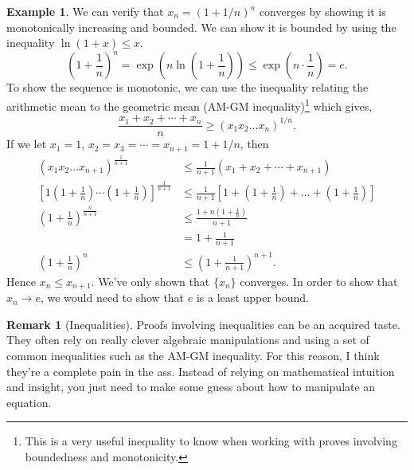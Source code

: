 \documentclass{article}
\theoremstyle{definition}
\newtheorem{example}{Example}[section]
\newtheorem{remark}{Remark}[section]
\begin{document}
\begin{example}
	We can verify that $ x_n=(1+1/n)^n $ converges by showing it is monotonically increasing and bounded. We can show it is bounded by using the inequality $ \ln(1+x)\le x $. $$\left(1+\frac{1}{n}\right)^n=\exp\left(n\ln\left(1+\frac{1}{n} \right)\right)\le \exp\left(n\cdot\frac{1}{n}\right)=e. $$ To show the sequence is monotonic, we can use the inequality relating the arithmetic mean to the geometric mean (AM-GM inequality)\footnote{This is a very useful inequality to know when working with proves involving boundedness and monotonicity.} which gives, $$ \frac{x_1+x_2+\cdots+x_n}{n}\ge(x_1x_2\ldots x_n)^{1/n}.$$ If we let $ x_1=1 $, $ x_2=x_3=\cdots=x_{n+1}=1+1/n $, then 
	\begin{align*}
(x_1x_2\ldots x_{n+1})^{\frac{1}{n+1}}&\le \frac{1}{n+1}(x_1+x_2+\cdots+x_{n+1})\\\left[1\left(1+\frac{1}{n}\right)\cdots \left(1+\frac{1}{n}\right)\right]^\frac{1}{n+1}&\le\frac{1}{n+1}\left[1+\left(1+\frac{1}{n}\right)+\ldots + \left(1+\frac{1}{n}\right)\right]\\\left(1+\frac{1}{n}\right)^\frac{n}{n+1}&\le \frac{1+n\left(1+\frac{1}{n}\right)}{n+1}\\&=1+\frac{1}{n+1}\\
\left(1+\frac{1}{n}\right)^n&\le\left(1+\frac{1}{n+1}\right)^{n+1}.
	\end{align*}
	Hence $ x_n\le x_{n+1} $. We've only shown that $ \{x_n\} $ converges. In order to show that $ x_n\to e $, we would need to show that $ e $ is a least upper bound. 
\end{example}
\begin{remark}[Inequalities]
	Proofs involving inequalities can be an acquired taste. They often rely on really clever algebraic manipulations and using a set of common inequalities such as the AM-GM inequality. For this reason, I think they're a complete pain in the ass. Instead of relying on mathematical intuition and insight, you just need to make some guess about how to manipulate an equation. 
\end{remark}
\end{document}
